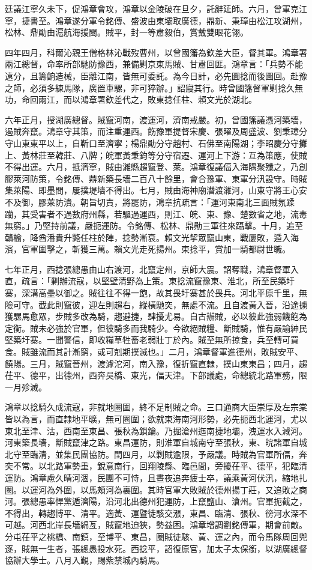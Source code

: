 \begin{pinyinscope}
廷議江寧久未下，促鴻章會攻，鴻章以金陵破在旦夕，託辭延師。六月，曾軍克江寧，捷書至。鴻章遂分軍令銘傳、盛波由東壩取廣德，鼎新、秉璋由松江攻湖州，松林、鼎勛由滬航海援閩。賊平，封一等肅毅伯，賞戴雙眼花翎。

四年四月，科爾沁親王僧格林沁戰歿曹州，以曾國籓為欽差大臣，督其軍。鴻章署兩江總督，命率所部馳防豫西，兼備剿京東馬賊、甘肅回匪。鴻章言：「兵勢不能遠分，且籌餉造械，臣離江南，皆無可委託。為今日計，必先圖捻而後圖回。赴豫之師，必須多練馬隊，廣置車騾，非可猝辦。」詔寢其行。時曾國籓督軍剿捻久無功，命回兩江，而以鴻章署欽差代之，敗東捻任柱、賴文光於湖北。

六年正月，授湖廣總督。賊竄河南，渡運河，濟南戒嚴。初，曾國籓議憑河築墻，遏賊奔竄。鴻章守其策，而注重運西。飭豫軍提督宋慶、張曜及周盛波、劉秉璋分守山東東平以上，自靳口至濟寧；楊鼎勛分守趙村、石佛至南陽湖；李昭慶分守攤上、黃林莊至韓莊、八牌；皖軍黃秉鈞等分守宿遷、運河上下游：互為策應，使賊不得出運。六月，抵濟寧，賊由濰縣趨竄登、萊。鴻章復議偪入海隅聚殲之，乃創膠萊河防策，令銘傳、鼎新築長墻二百八十餘里，會合豫軍、東軍分汛設守。時賊集萊陽、即墨間，屢撲堤墻不得出。七月，賊由海神廟潛渡濰河，山東守將王心安不及御，膠萊防潰。朝旨切責，將罷防，鴻章抗疏言：「運河東南北三面賊氛蹂躪，其受害者不過數府州縣，若驅過運西，則江、皖、東、豫、楚數省之地，流毒無窮。」乃堅持前議，嚴扼運防。令銘傳、松林、鼎勛三軍往來躡擊。十月，追至贛榆，降酋潘貴升斃任柱於陣，捻勢漸衰。賴文光挈眾竄山東，戰屢敗，遁入海濱，官軍圍擊之，斬獲三萬。賴文光走死揚州。東捻平，賞加一騎都尉世職。

七年正月，西捻張總愚由山右渡河，北竄定州，京師大震。詔奪職，鴻章督軍入直，疏言：「剿辦流寇，以堅壁清野為上策。東捻流竄豫東、淮北，所至民築圩寨，深溝高壘以御之。賊往往不得一飽，故其畏圩寨甚於畏兵。河北平原千里，無險可守。截此則竄彼，迎左則趨右，縱橫馳突，無處不流。且自渡黃入晉，沿途擄獲騾馬愈眾，步賊多改為騎，趨避捷，肆擾尤易。自古辦賊，必以彼此強弱饑飽為定衡。賊未必強於官軍，但彼騎多而我騎少。今欲絕賊糧、斷賊騎，惟有嚴諭紳民堅築圩寨。一聞警信，即收糧草牲畜老弱壯丁於內。賊至無所掠食，兵至轉可買食。賊雖流而其計漸窮，或可剋期撲滅也。」二月，鴻章督軍進德州，敗賊安平、饒陽。三月，賊竄晉州，渡滹沱河，南入豫，復折竄直隸，撲山東東昌；四月，趨茌平、德平，出德州，西奔吳橋、東光，偪天津。下部議處，命總統北路軍務，限一月殄滅。

鴻章以捻騎久成流寇，非就地圈圍，終不足制賊之命。三口通商大臣崇厚及左宗棠皆以為言，而直隸地平曠，無可圈圍；欲就東海南河形勢，必先扼西北運河，尤以東北至津、沽，西南至東昌、張秋為鎖鑰。乃掘滄州迤南捷地壩，洩運水入減河。河東築長墻，斷賊竄津之路。東昌運防，則淮軍自城南守至張秋，東、皖諸軍自城北守至臨清，並集民團協防。閏四月，以剿賊逾限，予嚴議。時賊為官軍所偪，奔突不常。以北路軍勢重，銳意南行，回翔陵縣、臨邑間，旁擾茌平、德平，犯臨清運防。鴻章慮久晴河涸，民團不可恃，且晝夜追奔疲士卒，議乘黃河伏汛，縮地扎圈。以運河為外圍，以馬頰河為裏圍。其時官軍大敗賊於德州揚丁莊，又追敗之商河。張總愚率悍黨遁濟陽，沿河北出德州犯運防，上竄鹽山、滄州。官軍扼截之，不得出，轉趨博平、清平。適黃、運暨徒駭交漲，東昌、臨清、張秋、徬河水深不可越。河西北岸長墻綿亙，賊竄地迫狹，勢益困。鴻章增調劉銘傳軍，期會前敵。分屯茌平之桃橋、南鎮，至博平、東昌，圈賊徒駭、黃、運之內，而令馬隊周回兜逐，賊無一生者，張總愚投水死。西捻平，詔復原官，加太子太保銜，以湖廣總督協辦大學士。八月入覲，賜紫禁城內騎馬。


\end{pinyinscope}
